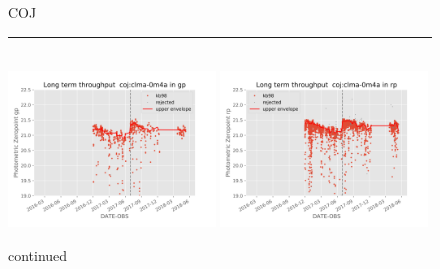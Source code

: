 \documentclass[]{spie}
\begin{document}
\begin{figure}
COJ \\ 
\rule{\textwidth}{0.4pt} \\
\includegraphics[width=0.49\textwidth]{images/photzptrend-coj-clma-0m4a-gp.png} \hspace*{\fill}
\includegraphics[width=0.49\textwidth]{images/photzptrend-coj-clma-0m4a-rp.png} \\[1ex]
\caption {continued}
\end{figure}
\end{document}
